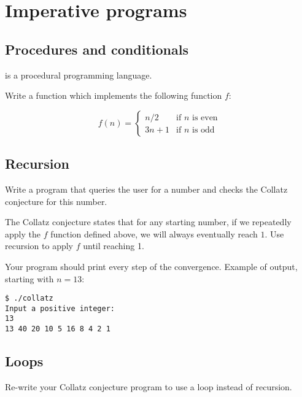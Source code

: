 \documentclass{../../tp}
\begin{document}
\section{Imperative programs}

\subsection{Procedures and conditionals}

\pascal is a procedural programming language. 

\begin{instruction}
	Write a \pascal function which implements the following function $f$:
		
	\begin{equation*}
		f(n) = 
			\begin{cases}
				n/2 & \text{if $n$ is even} \\
				3n + 1 & \text{if $n$ is odd} 
			\end{cases}
	\end{equation*}
\end{instruction}

\subsection{Recursion}
\begin{instruction}
Write a program that queries the user for a number and checks the Collatz conjecture for this number.

The Collatz conjecture states that for any starting number,  if we repeatedly apply the $f$ function defined above, we will always eventually reach $1$. Use recursion to apply $f$ until reaching 1. 

Your program should print every step of the convergence. Example of output, starting with $n = 13$: 
\begin{verbatim}
$ ./collatz
Input a positive integer:
13
13 40 20 10 5 16 8 4 2 1
\end{verbatim}
\end{instruction}

\subsection{Loops}
\begin{instruction}
Re-write your Collatz conjecture program to use a loop instead of recursion.
\end{instruction}
\end{document}

